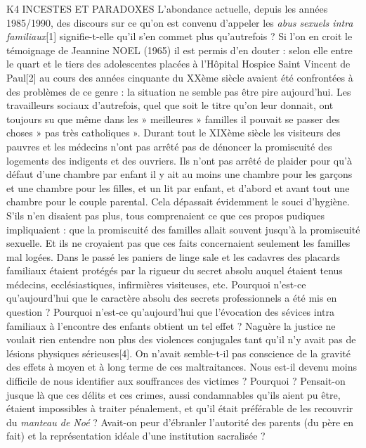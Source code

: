 K4 INCESTES ET PARADOXES
 L'abondance actuelle, depuis les années 1985/1990, des discours sur ce qu'on est convenu d'appeler les \emph{abus sexuels intra familiaux}[1] signifie-t-elle qu'il s'en commet plus qu'autrefois ? Si l'on en croit le témoignage de Jeannine NOEL (1965) il est permis d'en douter : selon elle entre le quart et le tiers des adolescentes placées à l'Hôpital Hospice Saint Vincent de Paul[2] au cours des années cinquante du XXème siècle avaient été confrontées à des problèmes de ce genre : la situation ne semble pas être pire aujourd'hui. 
 Les travailleurs sociaux d'autrefois, quel que soit le titre qu'on leur donnait, ont toujours su que même dans les » meilleures » familles il pouvait se passer des choses » pas très catholiques ». Durant tout le XIXème siècle les visiteurs des pauvres et les médecins n'ont pas arrêté pas de dénoncer la promiscuité des logements des indigents et des ouvriers. Ils n'ont pas arrêté de plaider pour qu'à défaut d'une chambre par enfant il y ait au moins une chambre pour les garçons et une chambre pour les filles, et un lit par enfant, et d'abord et avant tout une chambre pour le couple parental. Cela dépassait évidemment le souci d'hygiène. S'ils n'en disaient pas plus, tous comprenaient ce que ces propos pudiques impliquaient : que la promiscuité des familles allait souvent jusqu'à la promiscuité sexuelle. Et ils ne croyaient pas que ces faits concernaient seulement les familles mal logées. 
 Dans le passé les paniers de linge sale et les cadavres des placards familiaux étaient protégés par la rigueur du secret absolu auquel étaient tenus médecins, ecclésiastiques, infirmières visiteuses, etc. Pourquoi n'est-ce qu'aujourd'hui que le caractère absolu des secrets professionnels a été mis en question ? Pourquoi n'est-ce qu'aujourd'hui que l'évocation des sévices intra familiaux à l'encontre des enfants obtient un tel effet ? Naguère la justice ne voulait rien entendre non plus des violences conjugales tant qu'il n'y avait pas de lésions physiques sérieuses[4]. On n'avait semble-t-il pas conscience de la gravité des effets à moyen et à long terme de ces maltraitances. Nous est-il devenu moins difficile de nous identifier aux souffrances des victimes ? Pourquoi ? Pensait-on jusque là que ces délits et ces crimes, aussi condamnables qu'ils aient pu être, étaient impossibles à traiter pénalement, et qu'il était préférable de les recouvrir du \emph{manteau de Noé} ? Avait-on peur d'ébranler l'autorité des parents (du père en fait) et la représentation idéale d'une institution sacralisée ? 
